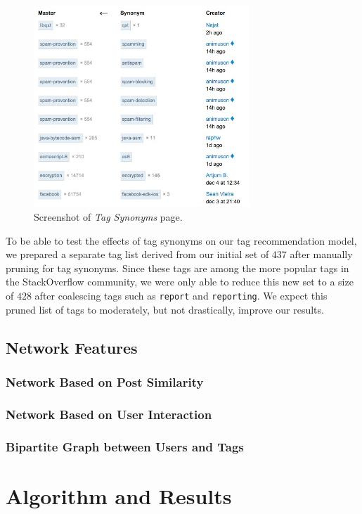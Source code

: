 \documentclass[10pt]{IEEEtran}
\begin{document}
\begin{figure}[h]
  \centering
    \includegraphics[width=3.2in]{tagsynonyms_so.jpg}
  \caption{Screenshot of \textit{Tag Synonyms} page.}
  \label{fig:syn}
\end{figure}

To be able to test the effects of tag synonyms on our tag recommendation model, we prepared a separate tag list derived from our initial set of $437$ after manually pruning for tag synonyms. Since these tags are among the more popular tags in the StackOverflow community, we were only able to reduce this new set to a size of $428$ after coalescing tags such as \texttt{report} and \texttt{reporting}. We expect this pruned list of tags to moderately, but not drastically, improve our results.

\subsection{Network Features}

\subsubsection{Network Based on Post Similarity}

\subsubsection{Network Based on User Interaction}

\subsubsection{Bipartite Graph between Users and Tags}

\section{Algorithm and Results}
\end{document}
